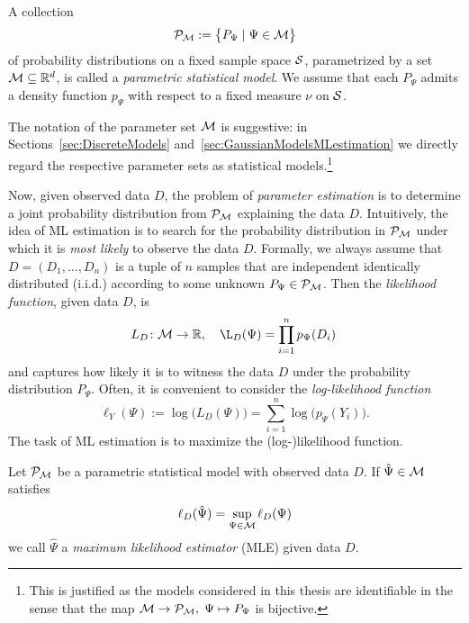 \begin{defn} \label{defn:StatisticalModel}
	A collection
		\[ \mathcal{P}_{\mathcal{M}} := \big\lbrace P_\Psi \mid \Psi \in \mathcal{M} \big\rbrace \]
	of probability distributions on a fixed sample space $\mathcal{S}$, parametrized by a set $\mathcal{M} \subseteq \mathbb R^d$, is called a \emph{parametric statistical model}. We assume that each $P_{\Psi}$ admits a density function $p_{\Psi}$ with respect to a fixed measure $\nu$ on $\mathcal{S}$.
	\hfill{}
\end{defn}

The notation of the parameter set $\mathcal{M}$ is suggestive: in Sections~\ref{sec:DiscreteModels} and~\ref{sec:GaussianModelsMLestimation} we directly regard the respective parameter sets as statistical models.\footnote{This is justified as the models considered in this thesis are identifiable in the sense that the map $\mathcal{M} \to \mathcal{P}_{\mathcal{M}}, \; \Psi \mapsto P_{\Psi}$ is bijective.}

Now, given observed data $D$, the problem of \emph{parameter estimation} is to determine a joint probability distribution from $\mathcal{P}_{\mathcal{M}}$ explaining the data $D$. 
Intuitively, the idea of ML estimation is to search for the probability distribution in $\mathcal{P}_{\mathcal{M}}$ under which it is \emph{most likely} to observe the data $D$.
Formally, we always assume that $D = (D_1, \ldots, D_n)$ is a tuple of $n$ samples that are independent identically distributed (i.i.d.) according to some unknown $P_{\Psi} \in \mathcal{P}_{\mathcal{M}}$.
Then the \emph{likelihood function}, given data $D$, is
	\begin{equation}\label{eq:LikelihoodGeneral}
		L_D \colon \Mcal \to \RR, \quad \L_D(\Psi) = \prod_{i=1}^n p_\Psi(D_i) \,
	\end{equation}
and captures how likely it is to witness the data $D$ under the probability distribution $P_{\Psi}$. Often, it is convenient to consider the \emph{log-likelihood function}
	\begin{equation}\label{eq:LogLikelihoodGeneral}
		\ell_Y(\Psi) := \log \big( L_D(\Psi) \big) = \sum_{i=1}^n \log \big(p_\Psi(Y_i) \big) .
	\end{equation}
The task of ML estimation is to maximize the (log-)likelihood function.

\begin{defn}
	Let $\mathcal{P}_{\mathcal{M}}$ be a parametric statistical model with observed data $D$. If $\hat{\Psi} \in \mathcal{M}$ satisfies
		\[ \ell_D(\hat{\Psi}) = \sup_{\Psi \in \mathcal{M}} \ell_D(\Psi) \]
	we call $\hat{\Psi}$ a \emph{maximum likelihood estimator} (MLE) given data $D$.
	\hfill{}
\end{defn}

